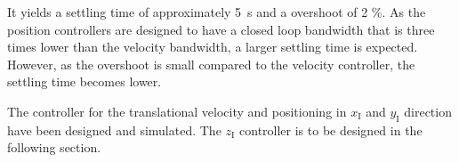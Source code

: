 \begin{minipage}{\linewidth}
\begin{minipage}{0.46\linewidth}
\begin{figure}[H]
            \centering
            \label{fig:positionControllersXYAction}
        \end{figure}
    \end{minipage}
\end{minipage}
\newpage
 It yields a settling time of approximately \SI{5}{s} and a overshoot of 2 \%. As the position controllers are designed to have a closed loop bandwidth that is three times lower than the velocity bandwidth, a larger settling time is expected. However, as the overshoot is small compared to the velocity controller, the settling time becomes lower.%

The controller for the translational velocity and positioning in $x_{\mathrm{I}}$ and $y_{\mathrm{I}}$ direction have been designed and simulated. The $z_{\mathrm{I}}$ controller is to be designed in the following section.
